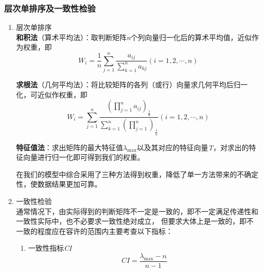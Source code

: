 \documentclass[a4paper, 12pt]{article}
\numberwithin{equation}{section}
\begin{document}
                \subsubsection{层次单排序及一致性检验}
                    \begin{enumerate}[(1)]
                        \item 层次单排序 \\
                            \textbf{和积法}（算术平均法）：取判断矩阵\textit{n}个列向量归一化后的算术平均值，近似作为权重，即
                            \begin{equation}
                                W_{i} = \frac{1}{n} \sum_{j=1}^{n} \frac{a_{ij}}{\sum_{k=1}^{n} a_{kj}} (i = 1, 2, \cdots, n)
                            \end{equation}

                            \textbf{求根法}（几何平均法）：将比较矩阵的各列（或行）向量求几何平均后归一化，可近似作权重，即
                            \begin{equation}
                                W_{i} = \sum_{j=1}^{n} \frac{(\prod_{j=1}^{n} a_{ij})_{\frac{1}{n}}}{\sum_{k=1}^{n} (\prod_{j=1}^{n})_{\frac{1}{n}}} (i = 1, 2, \cdots, n)
                            \end{equation}

                            \textbf{特征值法}：求出矩阵的最大特征值$ \lambda _{\max} $以及其对应的特征向量\textit{T}，对求出的特征向量进行归一化即可得到我们的权重。

                            在我们的模型中综合采用了三种方法得到权重，降低了单一方法带来的不确定性，使数据结果更加可靠。


                        \item 一致性检验 \\
                        通常情况下，由实际得到的判断矩阵不一定是一致的，即不一定满足传递性和一致性实际中，也不必要求一致性绝对成立，
                        但要求大体上是一致的，即不一致的程度应在容许的范围内主要考查以下指标：
                            \begin{enumerate}
                                \item 一致性指标\textit{CI}
                                    \begin{equation}
                                        CI = \frac{\lambda _{\max} - n}{n - 1}
                                    \end{equation}


\end{enumerate}
\end{enumerate}
\end{document}
